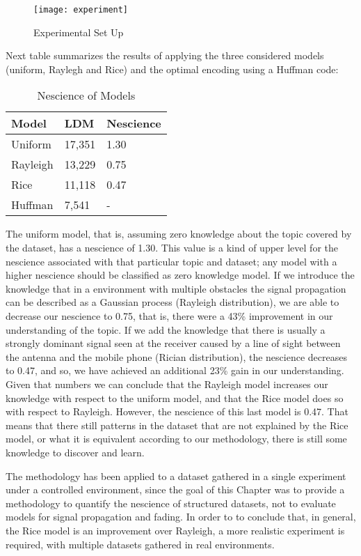 \begin{figure}[h]
\centering\texttt{[image: experiment]}
\caption{\label{fig:Experimental-Set-Up}Experimental Set Up}
\end{figure}

Next table summarizes the results of applying the three considered models (uniform, Raylegh and Rice) and the optimal encoding using a Huffman code:

\begin{table}[h]
\centering
\begin{tabular}{l l l}
\toprule
\textbf{Model} & \textbf{LDM} & \textbf{Nescience} \\
\midrule
Uniform & 17,351 & 1.30 \\
Rayleigh & 13,229 & 0.75 \\
Rice & 11,118 & 0.47 \\
Huffman & 7,541 & - \\
\bottomrule
\end{tabular}
\caption{Nescience of Models}
\end{table}

The uniform model, that is, assuming zero knowledge about the topic covered by the dataset, has a nescience of 1.30. This value is a kind of upper level for the nescience associated with that particular topic and dataset; any model with a higher nescience should be classified as zero knowledge model. If we introduce the knowledge that in a environment with multiple obstacles the signal propagation can be described as a Gaussian process (Rayleigh distribution), we are able to decrease our nescience to 0.75, that is, there were a 43\% improvement in our understanding of the topic. If we add the knowledge that there is usually a strongly dominant signal seen at the receiver caused by a line of sight between the antenna and the mobile phone (Rician distribution), the nescience decreases to 0.47, and so, we have achieved an additional 23\% gain in our understanding. Given that numbers we can conclude that the Rayleigh model increases our knowledge with respect to the uniform model, and that the Rice model does so with respect to Rayleigh. However, the nescience of this last model is 0.47. That means that there still patterns in the dataset that are not explained by the Rice model, or what it is equivalent according to our methodology, there is still some knowledge to discover and learn.

The methodology has been applied to a dataset gathered in a single experiment under a controlled environment, since the goal of this Chapter was to provide a methodology to quantify the nescience of structured datasets, not to evaluate models for signal propagation and fading. In order to to conclude that, in general, the Rice model is an improvement over Rayleigh, a more realistic experiment is required, with multiple datasets gathered in real environments.

